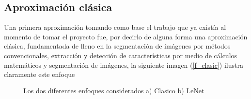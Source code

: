 \documentclass[12pt]{book} %
\begin{document}
	\subsection{Aproximación clásica \label{clasica}}
		Una primera aproximación tomando como base el trabajo que ya existía al momento de tomar el proyecto fue, por decirlo de alguna forma una aproximación 
		clásica, fundamentada de lleno en la segmentación de imágenes por métodos convencionales, extracción y detección de características por medio de 
		cálculos matemáticos y segmentación de imágenes, la siguiente imagen (\ref{f_clasic}) ilustra claramente este enfoque\\
		\begin{figure}[t]
		 	\centering
			\caption{Los dos diferentes enfoques considerados a) Clasico b) LeNet \label{fig:enfoque_clásico}} 
		\end{figure}
\end{document}
